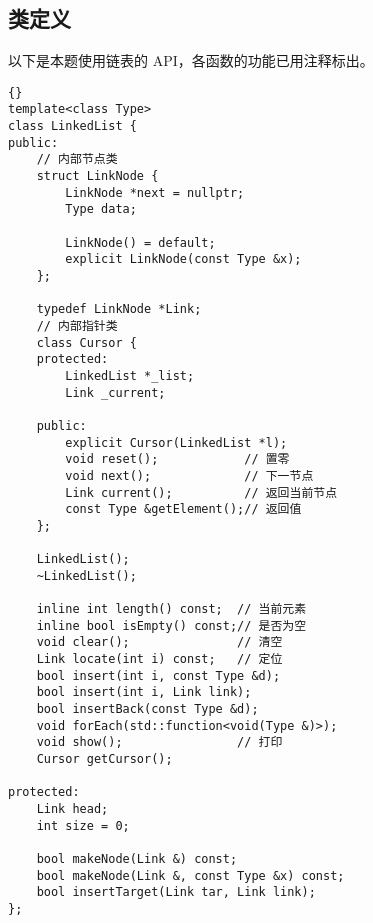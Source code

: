 \subsection{类定义}
以下是本题使用链表的 API，各函数的功能已用注释标出。
\begin{lstlisting}[morendkeywords={LinkedList}, firstnumber=637, caption=LinkedList 类定义]{}
template<class Type>
class LinkedList {
public: 
    // 内部节点类
    struct LinkNode {   
        LinkNode *next = nullptr;
        Type data;

        LinkNode() = default;
        explicit LinkNode(const Type &x);
    };

    typedef LinkNode *Link;
    // 内部指针类
    class Cursor {
    protected:
        LinkedList *_list;
        Link _current;

    public:
        explicit Cursor(LinkedList *l);
        void reset();            // 置零
        void next();             // 下一节点
        Link current();          // 返回当前节点
        const Type &getElement();// 返回值
    };

    LinkedList();
    ~LinkedList();

    inline int length() const;  // 当前元素
    inline bool isEmpty() const;// 是否为空
    void clear();               // 清空
    Link locate(int i) const;   // 定位
    bool insert(int i, const Type &d);
    bool insert(int i, Link link);
    bool insertBack(const Type &d);
    void forEach(std::function<void(Type &)>);
    void show();                // 打印
    Cursor getCursor();

protected:
    Link head;
    int size = 0;

    bool makeNode(Link &) const;
    bool makeNode(Link &, const Type &x) const;
    bool insertTarget(Link tar, Link link);
};
\end{lstlisting}

